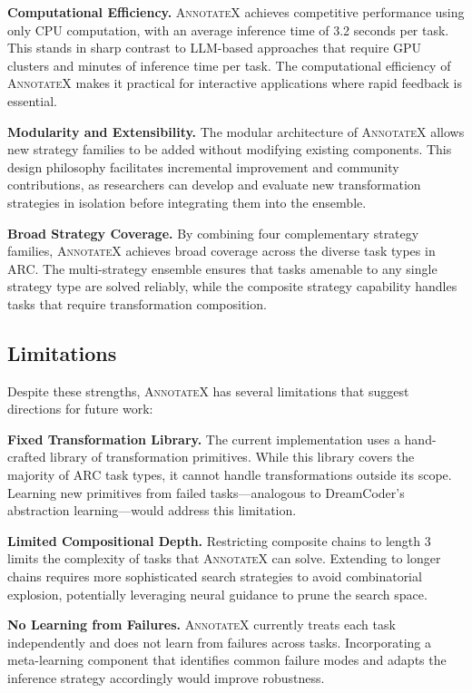 \documentclass[conference,10pt,letterpaper]{IEEEtran}
\newcommand{\annotatexname}{\textsc{AnnotateX}}
\begin{document}
\textbf{Computational Efficiency.} \annotatexname{} achieves competitive performance using only CPU computation, with an average inference time of 3.2 seconds per task. This stands in sharp contrast to LLM-based approaches that require GPU clusters and minutes of inference time per task. The computational efficiency of \annotatexname{} makes it practical for interactive applications where rapid feedback is essential.

\textbf{Modularity and Extensibility.} The modular architecture of \annotatexname{} allows new strategy families to be added without modifying existing components. This design philosophy facilitates incremental improvement and community contributions, as researchers can develop and evaluate new transformation strategies in isolation before integrating them into the ensemble.

\textbf{Broad Strategy Coverage.} By combining four complementary strategy families, \annotatexname{} achieves broad coverage across the diverse task types in ARC. The multi-strategy ensemble ensures that tasks amenable to any single strategy type are solved reliably, while the composite strategy capability handles tasks that require transformation composition.

\subsection{Limitations}

Despite these strengths, \annotatexname{} has several limitations that suggest directions for future work:

\textbf{Fixed Transformation Library.} The current implementation uses a hand-crafted library of transformation primitives. While this library covers the majority of ARC task types, it cannot handle transformations outside its scope. Learning new primitives from failed tasks---analogous to DreamCoder's abstraction learning---would address this limitation.

\textbf{Limited Compositional Depth.} Restricting composite chains to length 3 limits the complexity of tasks that \annotatexname{} can solve. Extending to longer chains requires more sophisticated search strategies to avoid combinatorial explosion, potentially leveraging neural guidance to prune the search space.

\textbf{No Learning from Failures.} \annotatexname{} currently treats each task independently and does not learn from failures across tasks. Incorporating a meta-learning component that identifies common failure modes and adapts the inference strategy accordingly would improve robustness.
\end{document}
